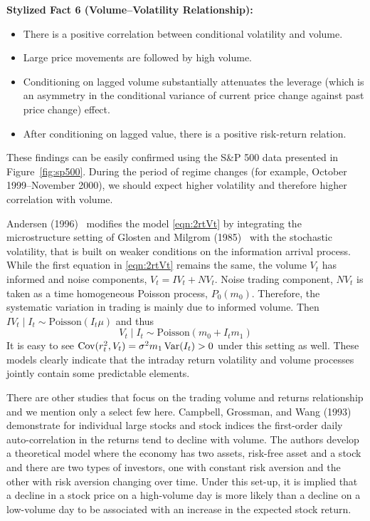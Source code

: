 \noindent\textbf{Stylized Fact 6 (Volume--Volatility Relationship):} 

        \begin{itemize}
        \item  There is a positive correlation between conditional volatility and volume.
        \item Large price movements are followed by high volume.
        \item Conditioning on lagged volume substantially attenuates the leverage (which is an asymmetry in the conditional variance of current price change against past price change) effect.
        \item After conditioning on lagged value, there is a positive risk-return relation.
        \end{itemize}


These findings can be easily confirmed using the S\&P 500 data presented in Figure~\ref{fig:sp500}. During the period of regime changes (for example, October 1999--November 2000), we should expect higher volatility and therefore higher correlation with volume. 


Andersen (1996)~\cite{andersen} modifies the model \eqref{eqn:2rtVt} by integrating the microstructure
setting of Glosten and Milgrom (1985)~\cite{glostenmilgrom} with the stochastic volatility, that is built on weaker conditions on the information arrival process. While the first equation in \eqref{eqn:2rtVt} remains the same, the volume $V_t$ has informed and noise components, $V_t = IV_t + NV_t$. Noise trading component, $NV_t$ is taken as a time homogeneous Poisson process, $P_0(m_0)$. Therefore, the systematic variation in trading is mainly due to informed volume. Then $IV_t \;|\; I_t \sim \text{Poisson}(I_t \mu)$ and thus
	\begin{equation} \label{eqn:2VtIt}
	V_t \;|\; I_t \sim \text{Poisson}(m_0 + I_t m_1)
	\end{equation}
It is easy to see $\operatorname{Cov}(r_t^2,V_t) = \sigma^2 m_1 \operatorname{Var}(I_t) > 0$ under this setting as well. These models clearly indicate that the intraday return volatility and volume processes jointly contain some predictable elements.


There are other studies that focus on the trading volume and returns relationship and we mention only a select few here. Campbell, Grossman, and Wang (1993)~\cite{campbellgross} demonstrate for individual large stocks and stock indices the first-order daily auto-correlation in the returns tend to decline with volume. The authors develop a theoretical model where the economy has two assets, risk-free asset and a stock and there are two types of investors, one with constant risk aversion and the other with risk aversion changing over time. Under this set-up, it is implied that a decline in a stock price on a high-volume day is more likely than a decline on a low-volume day to be associated with an increase in the expected stock return.


